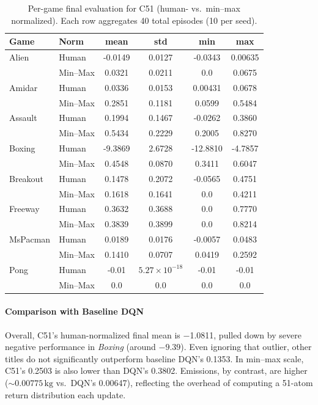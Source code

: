\begin{table}
	\caption{Per-game final evaluation for C51 (human- vs.\ min--max normalized). 
		Each row aggregates 40 total episodes (10 per seed).}
	\label{tab:c51_eval_gamewise}
	\centering
	\begin{tabular}{llcccc}
		\toprule
		\textbf{Game} & \textbf{Norm} & \textbf{mean} & \textbf{std} & \textbf{min} & \textbf{max}\\
		\midrule
		Alien & Human    & -0.0149 & 0.0127 & -0.0343 & 0.00635 \\
		& Min--Max & 0.0321  & 0.0211 & 0.0     & 0.0675 \\
		\cmidrule{1-6}
		Amidar & Human   & 0.0336  & 0.0153 & 0.00431 & 0.0678 \\
		& Min--Max & 0.2851 & 0.1181 & 0.0599  & 0.5484 \\
		\cmidrule{1-6}
		Assault & Human  & 0.1994  & 0.1467 & -0.0262 & 0.3860 \\
		& Min--Max & 0.5434 & 0.2229 & 0.2005  & 0.8270 \\
		\cmidrule{1-6}
		Boxing & Human   & -9.3869 & 2.6728 & -12.8810 & -4.7857 \\
		& Min--Max & 0.4548  & 0.0870 & 0.3411   & 0.6047 \\
		\cmidrule{1-6}
		Breakout & Human & 0.1478  & 0.2072 & -0.0565 & 0.4751 \\
		& Min--Max & 0.1618 & 0.1641 & 0.0     & 0.4211 \\
		\cmidrule{1-6}
		Freeway & Human  & 0.3632  & 0.3688 & 0.0      & 0.7770 \\
		& Min--Max & 0.3839 & 0.3899 & 0.0     & 0.8214 \\
		\cmidrule{1-6}
		MsPacman & Human & 0.0189  & 0.0176 & -0.0057 & 0.0483 \\
		& Min--Max & 0.1410 & 0.0707 & 0.0419 & 0.2592 \\
		\cmidrule{1-6}
		Pong & Human     & -0.01   & $5.27\times 10^{-18}$ & -0.01 & -0.01 \\
		& Min--Max & 0.0     & 0.0     & 0.0     & 0.0 \\
		\bottomrule
	\end{tabular}
\end{table}

\paragraph{Comparison with Baseline DQN}
Overall, C51's human-normalized final mean is \num{-1.0811}, pulled down by severe negative performance in \emph{Boxing} (around $-9.39$). Even ignoring that outlier, other titles do not significantly outperform baseline DQN's \num{0.1353}. In min--max scale, C51's \num{0.2503} is also lower than DQN's \num{0.3802}. Emissions, by contrast, are higher ($\sim0.00775\,\mathrm{kg}$ vs.\ DQN's \num{0,00647}), reflecting the overhead of computing a 51-atom return distribution each update.

